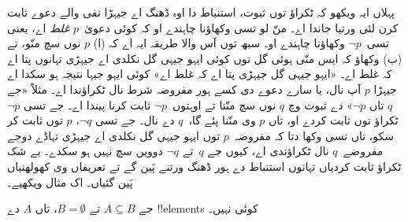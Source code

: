 \documentclass[../../../include/open-logic-section]{subfiles}
\begin{document}


پہلاں ایہ ویکھو کہ ٹکراؤ توں ثبوت، استنباط دا اوہ ڈھنگ اے جیہڑا نفی والے دعوے ثابت کرن لئی ورتیا جاندا اے۔ منّ لو تسی وکھاؤنا چاہندے او کہ کوئی دعویٰ~$p$ \emph{غلط} اے، یعنی تسی~$\lnot p$ وکھاؤنا چاہندے او۔ سبھ توں آس والا طریقہ ایہ اے کہ (ا) $p$ نوں سچ منّو، تے (ب) وکھاؤ کہ ایس منّی ہوئی گل توں کوئی ایہو جیہی گل نکلدی اے جیہڑی تہانوں پتا اے کہ غلط اے۔ «ایہو جیہی گل جیہڑی پتا اے کہ غلط اے» کوئی ایہو جیہا نتیجہ ہو سکدا اے جیہڑا $p$ آپ نال، یا سارے دعوے دی کسے ہور مفروضہ شرط نال ٹکراؤندا اے۔ مثلاً «جے $q$ تاں $\lnot p$» دے ثبوت وچ $q$ نوں سچ منّنا تے اوہتوں~$\lnot
p$ ثابت کرنا پیندا اے۔ جے تسی $\lnot p$ ٹکراؤ توں ثابت کردے او، تاں $p$ وی منّنا پئے گا،~$q$ دے نال۔ جے تسی $\lnot q$، $p$ توں ثابت کر سکو، تاں تسی وکھا دتا کہ مفروضہ~$p$ توں ایہو جیہی گل نکلدی اے جیہڑی تہاڈے دوجے مفروضے~$q$ نال ٹکراؤندی اے، کیوں جے $q$~تے $\lnot q$ دوویں سچ نہیں ہو سکدے۔ بے شک ٹکراؤ ثابت کردیاں تہانوں استنباط دے ہور ڈھنگ ورتنے پَین گے تے تعریفاں وی کھولھنیاں پَین گئیاں۔ اک مثال ویکھیے۔

\begin{prop}
  جے $A \subseteq B$ تے $B = \emptyset$، تاں $A$ دے !!{element}s کوئی نہیں۔
\end{prop}
\end{document}
